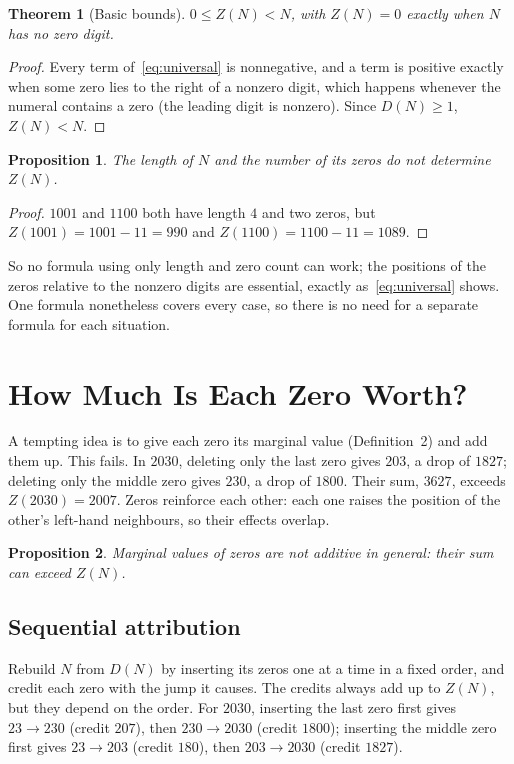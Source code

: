 \documentclass[11pt,a4paper]{article}
\newtheorem{theorem}{Theorem}
\newtheorem{proposition}{Proposition}
\theoremstyle{definition}
\newcommand{\Dz}{D}   %
\newcommand{\Zv}{Z}   %
\begin{document}
\begin{theorem}[Basic bounds]
$0\le \Zv(N)<N$, with $\Zv(N)=0$ exactly when $N$ has no zero digit.
\end{theorem}
\begin{proof}
Every term of~\eqref{eq:universal} is nonnegative, and a term is positive exactly when some zero lies to the right of a nonzero digit, which happens whenever the numeral contains a zero (the leading digit is nonzero). Since $\Dz(N)\ge 1$, $\Zv(N)<N$.
\end{proof}

\begin{proposition}
The length of $N$ and the number of its zeros do not determine $\Zv(N)$.
\end{proposition}
\begin{proof}
$1001$ and $1100$ both have length $4$ and two zeros, but $\Zv(1001)=1001-11=990$ and $\Zv(1100)=1100-11=1089$.
\end{proof}
So no formula using only length and zero count can work; the positions of the zeros relative to the nonzero digits are essential, exactly as~\eqref{eq:universal} shows. One formula nonetheless covers every case, so there is no need for a separate formula for each situation.

\section{How Much Is Each Zero Worth?}\label{sec:attrib}

A tempting idea is to give each zero its marginal value (Definition~2) and add them up. This fails. In $2030$, deleting only the last zero gives $203$, a drop of $1827$; deleting only the middle zero gives $230$, a drop of $1800$. Their sum, $3627$, exceeds $\Zv(2030)=2007$. Zeros reinforce each other: each one raises the position of the other's left-hand neighbours, so their effects overlap.

\begin{proposition}
Marginal values of zeros are not additive in general: their sum can exceed $\Zv(N)$.
\end{proposition}

\subsection{Sequential attribution}
Rebuild $N$ from $\Dz(N)$ by inserting its zeros one at a time in a fixed order, and credit each zero with the jump it causes. The credits always add up to $\Zv(N)$, but they depend on the order. For $2030$, inserting the last zero first gives $23\to 230$ (credit $207$), then $230\to 2030$ (credit $1800$); inserting the middle zero first gives $23\to 203$ (credit $180$), then $203\to 2030$ (credit $1827$).
\end{document}
